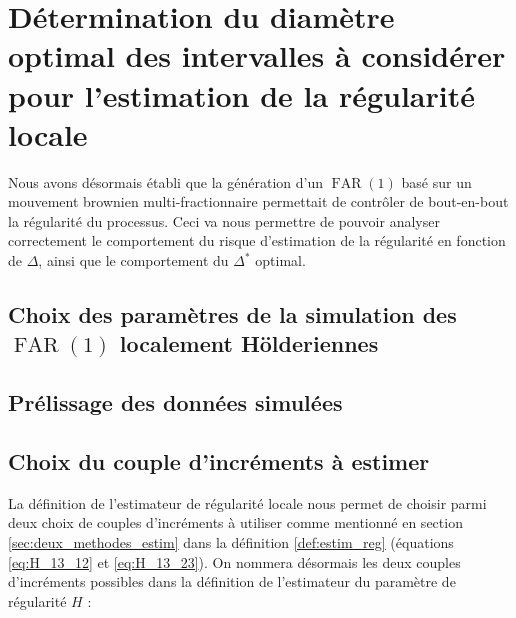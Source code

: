 \chapter{Détermination du diamètre optimal des intervalles à considérer pour l'estimation de la régularité locale }
\minitoc%


Nous avons désormais établi que la génération d'un $\operatorname{FAR}(1)$ basé sur un mouvement brownien multi-fractionnaire permettait de contrôler de bout-en-bout la régularité du processus. Ceci va nous permettre de pouvoir analyser correctement le comportement du risque d'estimation de la régularité en fonction de $\Delta$, ainsi que le comportement du $\Delta^*$ optimal.

\section{Choix des paramètres de la simulation des $\operatorname{FAR}(1)$ localement Hölderiennes}



\section{Prélissage des données simulées}





\section{Choix du couple d'incréments à estimer}

La définition de l'estimateur de régularité locale nous permet de choisir parmi deux choix de couples d'incréments à utiliser comme mentionné en section \ref{sec:deux_methodes_estim} dans la définition \ref{def:estim_reg} (équations \ref{eq:H_13_12} et \ref{eq:H_13_23}). On nommera désormais les deux couples d'incréments possibles dans la définition de l'estimateur du paramètre de régularité $H$ :

\bigskip

